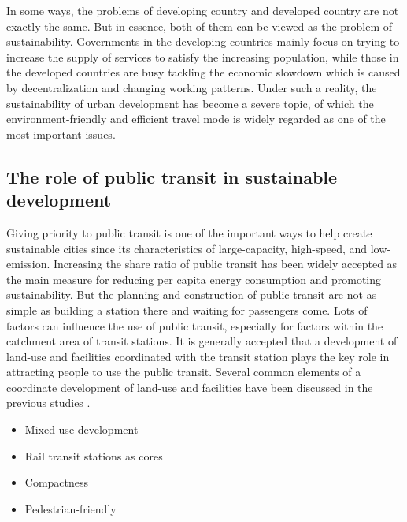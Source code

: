 In some ways, the problems of developing country and developed country are not exactly the same. But in essence, both of them can be viewed as the problem of sustainability. Governments in the developing countries mainly focus on trying to increase the supply of services to satisfy the increasing population, while those in the developed countries are busy tackling the economic slowdown which is caused by decentralization and changing working patterns. Under such a reality, the sustainability of urban development has become a severe topic, of which the environment-friendly and efficient travel mode is widely regarded as one of the most important issues.

\subsection{The role of public transit in sustainable development}
Giving priority to public transit is one of the important ways to help create sustainable cities since its characteristics of large-capacity, high-speed, and low-emission. Increasing the share ratio of public transit has been widely accepted as the main measure for reducing per capita energy consumption and promoting sustainability. But the planning and construction of public transit are not as simple as building a station there and waiting for passengers come. Lots of factors can influence the use of public transit, especially for factors within the catchment area of transit stations. It is generally accepted that a development of land-use and facilities coordinated with the transit station plays the key role in attracting people to use the public transit. Several common elements of a coordinate development of land-use and facilities have been discussed in the previous studies \cite{boarnet1997story,bernick1997transit,megally2001california,cervero2004transit}.

\begin{itemize}
	\setlength{\parskip}{0\baselineskip} %
	\item Mixed-use development
	\item Rail transit stations as cores
	\item Compactness
	\item Pedestrian-friendly
	\setlength{\parskip}{0.7\baselineskip} %
\end{itemize}

